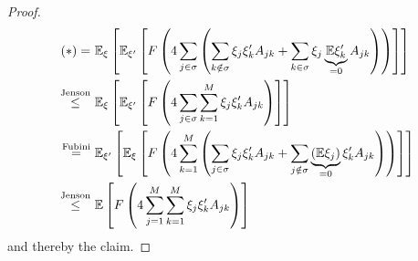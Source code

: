 \begin{proof}
\begin{equation*}
\begin{split}
(*) = \ &
\mathbb{E}_{\xi} \left[
\mathbb{E}_{\xi'} \left[
F\left(
4\sum_{j\in \sigma} \left(
\sum_{k\notin \sigma} \xi_j \xi_k' A_{jk}+ \sum_{k\in \sigma} \xi_j \underbrace{\mathbb{E}\xi'_k}_{=0} A_{jk}
\right)
\right)
\right]
\right] \\
\overset{\text{Jenson}}\leq \ &
\mathbb{E}_\xi \left[
\mathbb{E}_{\xi'} \left[
F \left(
4\sum_{j\in \sigma} \sum_{k=1}^M \xi_j \xi_k' A_{jk}
\right)
\right]
\right] \\
\overset{\text{Fubini}}= \  &
\mathbb{E}_{\xi'} \left[\mathbb{E}_\xi \left[
F\left(
4\sum_{k=1}^M \left(
\sum_{j\in \sigma} \xi_j \xi_k' A_{jk} + \sum_{j \notin \sigma}\underbrace{(\mathbb{E} \xi_j)}_{=0}\xi_k'A_{jk}
\right)
\right)
\right] \right] \\
\overset{\text{Jenson}}\leq \ & \mathbb{E} \left[F\left(
4 \sum_{j=1}^M \sum_{k=1}^M \xi_j \xi_k' A_{jk}
\right)\right]
\end{split}
\end{equation*}
and thereby the claim.
\end{proof}
